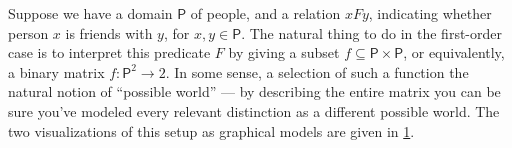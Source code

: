 \documentclass{article}
\newcommand\cmergearr[4]{
		\draw[arr,-] (#1) -- (#4) -- (#2);
		\draw[arr, shorten <=0] (#4) -- (#3);
	}
\newcommand\mergearr[3]{
		\coordinate (center-#1#2#3) at (barycentric cs:#1=1,#2=1,#3=1.2);
		\cmergearr{#1}{#2}{#3}{center-#1#2#3}
	}
\theoremstyle{plain}
\theoremstyle{definition}
\theoremstyle{remark}
\newcommand{\var}[1]{\mathsf{#1}}
\begin{document}
\begin{example}
    Suppose we have a domain $\var P$ of people, and a relation $xFy$, indicating whether person $x$ is friends with $y$, for $x,y\in \var P$. 
    The natural thing to do in the first-order case is to interpret this predicate $F$ by giving a subset $f \subseteq \var P \times \var P$, or equivalently, a binary matrix $f : \var P^2 \to 2$. 
    In some sense, a selection of such a function the natural notion of ``possible world'' --- by describing the entire matrix you can be sure you've modeled every relevant distinction as a different possible world. The two visualizations of this setup as graphical models are given in \cref{fig:friendrel}.
    
    \begin{figure}
        \centering
        \hfill
        \begin{subfigure}[]{0.4\textwidth} \centering
        \end{subfigure}
        \hfill\vline\hfill
        \begin{subfigure}[]{0.4\textwidth}\centering
        \end{subfigure}
        \hfill
        \caption{}
        \label{fig:friendrel}
    \end{figure}



\end{example}
\end{document}
